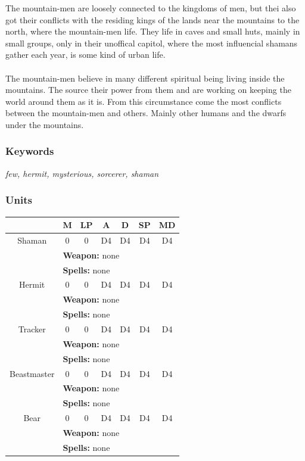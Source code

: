 \documentclass[a5paper,pagesize,10pt,bibtotoc,pointlessnumbers,
normalheadings,DIV=9,twoside=false]{scrbook}
\begin{document}
The mountain-men are loosely connected to the kingdoms of men, but thei also got their conflicts with the residing kings of the lands near the mountains to the north, where the mountain-men life.
They life in caves and small huts, mainly in small groups, only in their unoffical capitol, where the most influencial shamans gather each year, is some kind of urban life.\\
\\
The mountain-men believe in many different spiritual being living inside the mountains. The source their power from them and are working on keeping the world around them as it is.
From this circumstance come the most conflicts between the mountain-men and others. Mainly other humans and the dwarfs under the mountains.

\subsubsection{Keywords}
\emph{few, hermit, mysterious, sorcerer, shaman}

\subsubsection{Units}

 \begin{tabular}{||c c c c c c c||} 
 \hline
  & M & LP & A & D & SP & MD \\
 \hline\hline
 Shaman & 0 & 0 & D4 & D4 & D4 & D4 \\ 
  & \multicolumn{6}{l||}{\textbf{Weapon:} none} \\
  & \multicolumn{6}{l||}{\textbf{Spells:} none} \\
 \hline
 Hermit & 0 & 0 & D4 & D4 & D4 & D4 \\
  & \multicolumn{6}{l||}{\textbf{Weapon:} none} \\
  & \multicolumn{6}{l||}{\textbf{Spells:} none} \\
 \hline
 Tracker & 0 & 0 & D4 & D4 & D4 & D4 \\
  & \multicolumn{6}{l||}{\textbf{Weapon:} none} \\
  & \multicolumn{6}{l||}{\textbf{Spells:} none} \\
\hline
 Beastmaster & 0 & 0 & D4 & D4 & D4 & D4 \\
  & \multicolumn{6}{l||}{\textbf{Weapon:} none} \\
  & \multicolumn{6}{l||}{\textbf{Spells:} none} \\
\hline
 Bear & 0 & 0 & D4 & D4 & D4 & D4 \\
  & \multicolumn{6}{l||}{\textbf{Weapon:} none} \\
  & \multicolumn{6}{l||}{\textbf{Spells:} none} \\
\hline
\end{tabular}
\end{document}
